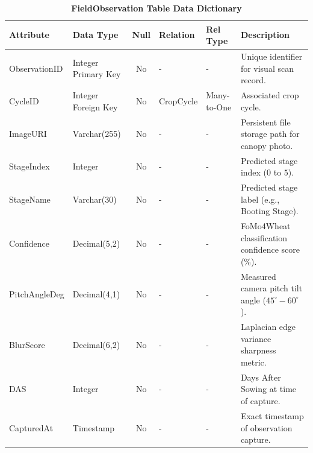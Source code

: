 \documentclass{FastFyp}
\begin{document}
\begin{table}[!htbp]
\footnotesize
\centering
\caption{\label{tab:observation_table} \textbf{FieldObservation Table Data Dictionary}}
\begin{tabular}{|l|l|c|l|l|p{4.5cm}|}
\hline
\textbf{Attribute} & \textbf{Data Type} & \textbf{Null} & \textbf{Relation} & \textbf{Rel Type} & \textbf{Description} \\ \hline
ObservationID & Integer Primary Key & No & - & - & Unique identifier for visual scan record. \\ \hline
CycleID & Integer Foreign Key & No & CropCycle & Many-to-One & Associated crop cycle. \\ \hline
ImageURI & Varchar(255) & No & - & - & Persistent file storage path for canopy photo. \\ \hline
StageIndex & Integer & No & - & - & Predicted stage index ($0$ to $5$). \\ \hline
StageName & Varchar(30) & No & - & - & Predicted stage label (e.g., Booting Stage). \\ \hline
Confidence & Decimal(5,2) & No & - & - & FoMo4Wheat classification confidence score (\%). \\ \hline
PitchAngleDeg & Decimal(4,1) & No & - & - & Measured camera pitch tilt angle ($45^\circ - 60^\circ$). \\ \hline
BlurScore & Decimal(6,2) & No & - & - & Laplacian edge variance sharpness metric. \\ \hline
DAS & Integer & No & - & - & Days After Sowing at time of capture. \\ \hline
CapturedAt & Timestamp & No & - & - & Exact timestamp of observation capture. \\ \hline
\end{tabular}
\end{table}
\end{document}
